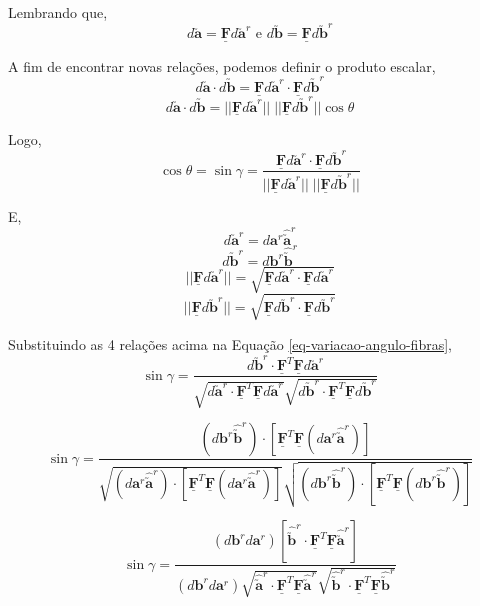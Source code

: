 	Lembrando que,
	\[d\utilde{\mathbf{a}}=\underline{\mathbf{F}}d\utilde{\mathbf{a}}^r\text{ e }d\utilde{\mathbf{b}}=\underline{\mathbf{F}}d\utilde{\mathbf{b}}^r\]
	
	A fim de encontrar novas relações, podemos definir o produto escalar,
	\[d\utilde{\mathbf{a}}\cdot d\utilde{\mathbf{b}}=\underline{\mathbf{F}}d\utilde{\mathbf{a}}^r\cdot\underline{\mathbf{F}}d\utilde{\mathbf{b}}^r\]
	\[d\utilde{\mathbf{a}}\cdot d\utilde{\mathbf{b}}=||\underline{\mathbf{F}}d\utilde{\mathbf{a}}^r||\;|| \underline{\mathbf{F}}d\utilde{\mathbf{b}}^r ||\cos\theta\]
	
	Logo,
	\begin{equation}\label{eq-variacao-angulo-fibras}
		\cos\theta=\sin\gamma=\frac{\underline{\mathbf{F}}d\utilde{\mathbf{a}}^r\cdot\underline{\mathbf{F}}d\utilde{\mathbf{b}}^r}{||\underline{\mathbf{F}}d\utilde{\mathbf{a}}^r||\;|| \underline{\mathbf{F}}d\utilde{\mathbf{b}}^r ||}
	\end{equation}
	
	E,
	\[d\utilde{\mathbf{a}}^r=d\mathbf{a}^r\hat{\utilde{\mathbf{a}}}^r\]
	\[d\utilde{\mathbf{b}}^r=d\mathbf{b}^r\hat{\utilde{\mathbf{b}}}^r\]
	\[||\underline{\mathbf{F}}d\utilde{\mathbf{a}}^r||=\sqrt{\underline{\mathbf{F}}d\utilde{\mathbf{a}}^r\cdot\underline{\mathbf{F}}d\utilde{\mathbf{a}}^r}\]
	\[||\underline{\mathbf{F}}d\utilde{\mathbf{b}}^r||=\sqrt{\underline{\mathbf{F}}d\utilde{\mathbf{b}}^r\cdot\underline{\mathbf{F}}d\utilde{\mathbf{b}}^r}\]
	
	Substituindo as 4 relações acima na Equação \eqref{eq-variacao-angulo-fibras},
	\[\sin\gamma=\frac{d\utilde{\mathbf{b}}^r\cdot\underline{\mathbf{F}}^T\underline{\mathbf{F}}d\utilde{\mathbf{a}}^r}{\sqrt{d\utilde{\mathbf{a}}^r\cdot\underline{\mathbf{F}}^T\underline{\mathbf{F}}d\utilde{\mathbf{a}}^r}\sqrt{d\utilde{\mathbf{b}}^r\cdot\underline{\mathbf{F}}^T\underline{\mathbf{F}}d\utilde{\mathbf{b}}^r}}\]
	
	\[\sin\gamma=\frac{(d\mathbf{b}^r\hat{\utilde{\mathbf{b}}}^r)\cdot[\underline{\mathbf{F}}^T\underline{\mathbf{F}}(d\mathbf{a}^r\hat{\utilde{\mathbf{a}}}^r)]}{\sqrt{(d\mathbf{a}^r\hat{\utilde{\mathbf{a}}}^r)\cdot[\underline{\mathbf{F}}^T\underline{\mathbf{F}}(d\mathbf{a}^r\hat{\utilde{\mathbf{a}}}^r)]}\sqrt{(d\mathbf{b}^r\hat{\utilde{\mathbf{b}}}^r)\cdot[\underline{\mathbf{F}}^T\underline{\mathbf{F}}(d\mathbf{b}^r\hat{\utilde{\mathbf{b}}}^r)]}}\]
	
	\[\sin\gamma=\frac{(d\mathbf{b}^rd\mathbf{a}^r)[\hat{\utilde{\mathbf{b}}}^r\cdot\underline{\mathbf{F}}^T\underline{\mathbf{F}}\hat{\utilde{\mathbf{a}}}^r]}{(d\mathbf{b}^rd\mathbf{a}^r)\sqrt{\hat{\utilde{\mathbf{a}}}^r\cdot\underline{\mathbf{F}}^T\underline{\mathbf{F}}\hat{\utilde{\mathbf{a}}}^r}\sqrt{\hat{\utilde{\mathbf{b}}}^r\cdot\underline{\mathbf{F}}^T\underline{\mathbf{F}}\hat{\utilde{\mathbf{b}}}^r}}\]
	
